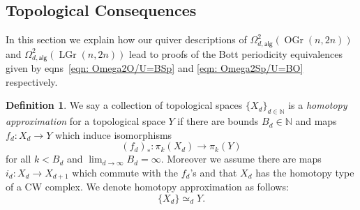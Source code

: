 \documentclass{amsart}
\theoremstyle{definition}
\newtheorem{definition}[theorem]{Definition}
\newcommand{\NN} {{\mathbb N}}		%
\newcommand{\alg}{\mathsf{alg}}
\newcommand{\LGr}{\operatorname{LGr}}
\newcommand{\OGr}{\operatorname{OGr}}
\newcommand{\LoopTwo}{\Omega^{2}_{d,\alg}}
\newcommand{\homotopyeq}{\simeq}
\begin{document}
\begin{center}
\end{center}

\subsection{Topological Consequences}\label{subsec: topological consequences}

In this section we explain how our quiver descriptions of $\LoopTwo
(\OGr(n,2n))$ and $\LoopTwo (\LGr(n,2n))$  lead to proofs of the Bott
periodicity equivalences given by eqns~\eqref{eqn: Omega2O/U=BSp} and
\eqref{eqn: Omega2Sp/U=BO} respectively.


\begin{definition}\label{defn: homotopy approximation}
We say a collection of topological spaces $\{X_{d} \}_{d\in \NN }$ is
a \emph{homotopy approximation} for a topological space $Y$ if there
are bounds $B_{d}\in \NN $ and maps $f_{d}:X_{d}\to Y$ which induce
isomorphisms 
\[
(f_{d})_{*}:\pi_{k}(X_{d})\to \pi_{k}(Y)
\]
for all $k<B_{d}$ and $\lim_{d\to \infty}B_{d} = \infty$. Moreover we
assume there are maps $i_{d}:X_{d}\to X_{d+1}$ which commute with the
$f_{d}$'s and that $X_{d}$ has the homotopy type of a CW complex. We
denote homotopy approximation as follows:
\[
\{X_{d} \}\homotopyeq_{d} Y.
\]
\end{definition}
\end{document}
